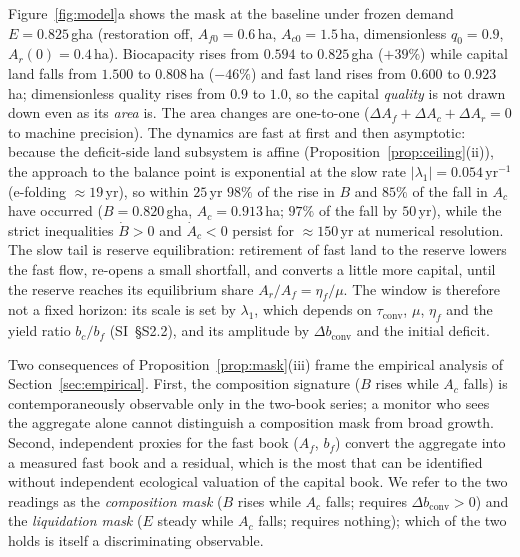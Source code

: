 \documentclass[preprint,12pt,authoryear]{elsarticle}
\newcommand{\dconv}{\Delta b_{\mathrm{conv}}}
\newcommand{\tconv}{\tau_{\mathrm{conv}}}
\begin{document}
Figure~\ref{fig:model}a shows the mask at the baseline under frozen demand $E=0.825$\,gha (restoration off, $A_{f0}=0.6$\,ha, $A_{c0}=1.5$\,ha, dimensionless $q_0=0.9$, $A_r(0)=0.4$\,ha). Biocapacity rises from $0.594$ to $0.825$\,gha ($+39\%$) while capital land falls from $1.500$ to $0.808$\,ha ($-46\%$) and fast land rises from $0.600$ to $0.923$\,ha; dimensionless quality rises from $0.9$ to $1.0$, so the capital \emph{quality} is not drawn down even as its \emph{area} is. The area changes are one-to-one ($\Delta A_f+\Delta A_c+\Delta A_r=0$ to machine precision). The dynamics are fast at first and then asymptotic: because the deficit-side land subsystem is affine (Proposition~\ref{prop:ceiling}(ii)), the approach to the balance point is exponential at the slow rate $|\lambda_1|=0.054\,\mathrm{yr}^{-1}$ (e-folding $\approx19$\,yr), so within $25$\,yr $98\%$ of the rise in $B$ and $85\%$ of the fall in $A_c$ have occurred ($B=0.820$\,gha, $A_c=0.913$\,ha; $97\%$ of the fall by $50$\,yr), while the strict inequalities $\dot B>0$ and $\dot A_c<0$ persist for $\approx150$\,yr at numerical resolution. The slow tail is reserve equilibration: retirement of fast land to the reserve lowers the fast flow, re-opens a small shortfall, and converts a little more capital, until the reserve reaches its equilibrium share $A_r/A_f=\eta_f/\mu$. The window is therefore not a fixed horizon: its scale is set by $\lambda_1$, which depends on $\tconv$, $\mu$, $\eta_f$ and the yield ratio $b_c/b_f$ (SI~\S S2.2), and its amplitude by $\dconv$ and the initial deficit.

Two consequences of Proposition~\ref{prop:mask}(iii) frame the empirical analysis of Section~\ref{sec:empirical}. First, the composition signature ($B$ rises while $A_c$ falls) is contemporaneously observable only in the two-book series; a monitor who sees the aggregate alone cannot distinguish a composition mask from broad growth. Second, independent proxies for the fast book ($A_f$, $b_f$) convert the aggregate into a measured fast book and a residual, which is the most that can be identified without independent ecological valuation of the capital book. We refer to the two readings as the \emph{composition mask} ($B$ rises while $A_c$ falls; requires $\dconv>0$) and the \emph{liquidation mask} ($E$ steady while $A_c$ falls; requires nothing); which of the two holds is itself a discriminating observable.
\end{document}
